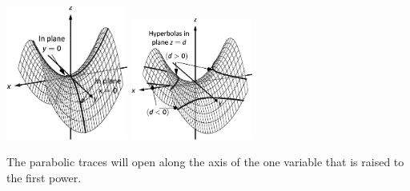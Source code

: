 \begin{center}
\includegraphics[width=0.3\textwidth]{fig_ana_geo_22b}\hspace*{1cm}
\includegraphics[width=0.3\textwidth]{fig_ana_geo_22c}
\end{center}

The parabolic traces will open along the axis of the one variable that is raised to the first power.

